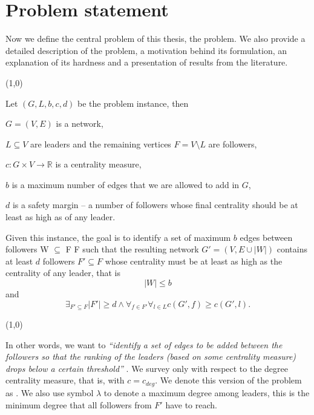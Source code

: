 \chapter{Problem statement}\label{chapter:ProblemStatement}

Now we define the central problem of this thesis, the \HL problem.
We also provide a detailed description of the problem, a motivation behind its formulation,
an explanation of its hardness and a presentation of results from the literature. 

\begin{center}
    \line(1,0){\textwidth}
\end{center}
\begin{definition}\label{HL}
    Let $(G, L, b, c, d)$ be the problem instance, then
    \begin{description}
        \item $G = (V, E)$ is a network,
        \item $L \subseteq V$ are leaders and the remaining vertices $F = V \setminus L$ are followers,
        \item $c : G \times V \rightarrow \mathbb{R}$ is a centrality measure,
        \item $b$ is a maximum number of edges that we are allowed to add in $G$,
        \item $d$ is a safety margin -- a number of followers whose final centrality should be at least as high as of any leader.
    \end{description}
    Given this instance, the goal is to identify a set of maximum $b$ edges between followers W $\subseteq$ F {\texttimes} F
    such that the resulting network $G' = (V, E \cup |W|)$ contains at least $d$ followers $F' \subseteq F$
    whose centrality must be at least as high as the centrality of any leader, that is
    $$|W| \leq b$$
    and
    $$\exists_{F' \subseteq F} |F'| \geq d \wedge \forall_{f \in F'} \forall_{l \in L} c(G', f) \geq c(G', l).$$
\end{definition}
\begin{center}
    \line(1,0){\textwidth}
\end{center}

In other words, we want to \emph{``identify a set of edges to be added between the followers so that
the ranking of the leaders (based on some centrality measure) drops below a certain threshold''} \cite{Waniek2017}.
We survey \HLshort only with respect to the degree centrality measure, that is, with $c = c_{deg}$.
We denote this version of the problem as \HLdeg.
We also use symbol $\lambda$ to denote a maximum degree among leaders, this is the minimum degree that
all followers from $F'$ have to reach.  

